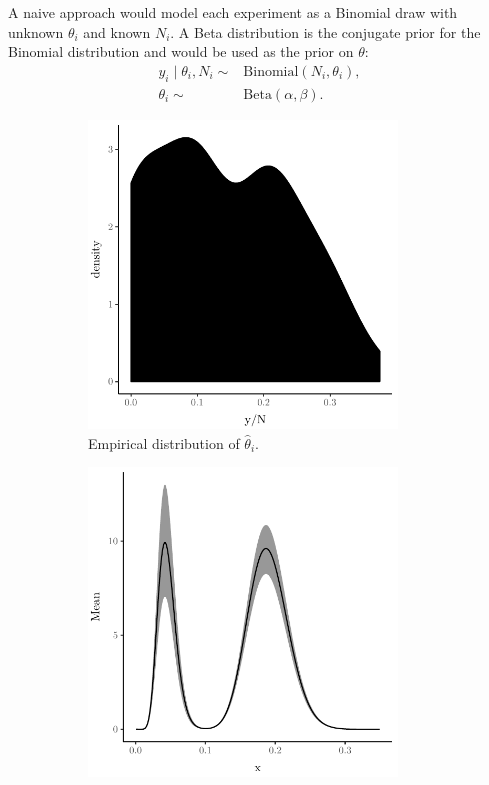 \documentclass[nojss]{jss}
\begin{document}
A naive approach would model each experiment as a Binomial draw with unknown $\theta _i$ and known $N_i$. A Beta distribution is the conjugate prior for the Binomial distribution and would be used as the prior on $\theta$:
\begin{align*}
y_i \mid \theta_i, N_i \sim & \text{Binomial}(N_i,\theta_i), \\
\theta_i \sim & \text{Beta}(\alpha, \beta).
\end{align*}

\begin{figure}[tb]
\begin{subfigure}[b]{0.5\textwidth}
	\centering
	\includegraphics[width=0.9\textwidth]{img/ratsImpericalDistribution.pdf}
	\caption{Empirical distribution of $\hat{\theta}_i$.}
	\label{fig:ratsImperical}
\end{subfigure}
\begin{subfigure}[b]{0.5\textwidth}
	\centering
	\includegraphics[width=0.9\textwidth]{img/ratsDirichletPrior.pdf}

\end{subfigure}
\end{figure}
\end{document}
